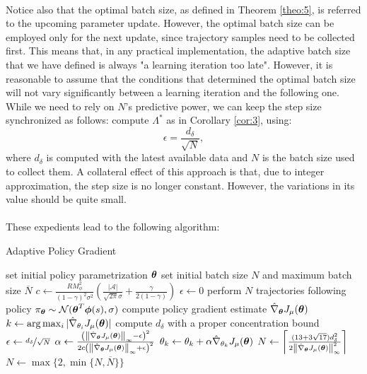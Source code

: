 \paragraph{}
Notice also that the optimal batch size, as defined in Theorem \ref{theo:5}, is referred to the upcoming parameter update. However, the optimal batch size can be employed only for the next update, since trajectory samples need to be collected first. This means that, in any practical implementation, the adaptive batch size that we have defined is always "a learning iteration too late". However, it is reasonable to assume that the conditions that determined the optimal batch size will not vary significantly between a learning iteration and the following one. While we need to rely on $N$'s predictive power, we can keep the step size synchronized as follows: compute $\Lambda^*$ as in Corollary \ref{cor:3}, using:
\[
	\epsilon = \frac{d_\delta}{\sqrt{N}},
\]
where $d_\delta$ is computed with the latest available data and $N$ is the batch size used to collect them. A collateral effect of this approach is that, due to integer approximation, the step size is no longer constant. However, the variations in its value should be quite small.
\paragraph{}
These expedients lead to the following algorithm: 
\begin{algorithm}[H]
\caption{Adaptive Policy Gradient}
\label{alg:adabatch}
\begin{algorithmic}
\State set initial policy parametrization $\vtheta$
\State set initial batch size $N$ and maximum batch size $\overline{N}$
\State $c \gets 		\frac{RM_{\phi}^2}{(1-\gamma)^2\sigma^2}\left(\frac{|\mathcal{A}|}{\sqrt{2\pi}\sigma} +	\frac{\gamma}{2(1-\gamma)}\right)$
\State $\epsilon \gets 0$
\While{$\epsilon < |\gradApp{\vtheta}|$} 
\State perform $N$ trajectories following policy 
	$\pi_{\vtheta} \sim \mathcal{N}(\vtheta^T\vphi(s),\sigma)$
\State compute policy gradient estimate $\gradApp{\vtheta}$
\State $k \gets \arg\max_i|\gradApp{\theta_i}|$
\State compute $d_\delta$ with a proper concentration bound
\State $\epsilon \gets \nicefrac{d_\delta}{\sqrt{N}}$
\State $\alpha \gets \frac{
		\left(\norm[\infty]{\gradApp{\vtheta}} - \epsilon\right)^2}
		{2c
		\left(\norm[\infty]{\gradApp{\vtheta}} + \epsilon\right)^2}$
\State $\theta_k \gets \theta_k + \alpha\gradApp{\theta_k}$
\State $N \gets \left\lceil\frac{(13+3\sqrt{17})d_{\delta}^2}{2\norm[\infty]{\gradApp{\vtheta}}^2}\right\rceil$
\State $N \gets \max\{2,\min\{N,\overline{N}\}\}$
\EndWhile
\end{algorithmic}
\end{algorithm}


